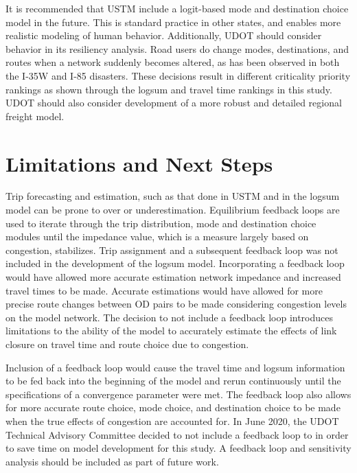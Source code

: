 It is recommended that USTM include a logit-based mode and destination
choice model in the future. This is standard practice in other states, and enables
more realistic modeling of
human behavior. Additionally, UDOT should consider behavior in its resiliency
analysis. Road users do change modes, destinations, and routes when a network
suddenly becomes altered, as has been observed in both the I-35W and I-85 disasters.
These decisions result in different criticality
priority rankings as shown through the logsum and travel time rankings in this study.
UDOT should also consider development of a more robust and detailed regional freight model.

\section{Limitations and Next Steps}

Trip forecasting and estimation, such as that done in USTM and in the logsum model
can be prone to over or underestimation. Equilibrium feedback loops are used to
iterate through the trip distribution, mode and destination choice modules until the
impedance value, which is a measure largely based on congestion, stabilizes.
Trip assignment and a subsequent feedback loop was not included in the development
of the logsum model. Incorporating a
feedback loop would have allowed more accurate estimation network impedance and increased
travel times to be made. Accurate estimations would have allowed for more precise
route changes between OD pairs to be made considering congestion levels on the model
network. The decision to not include a feedback loop introduces limitations to the
ability of the model to accurately estimate the effects of link closure on
travel time and route choice due to congestion.

Inclusion of a feedback loop would cause the
travel time and logsum information to be fed back into the beginning of the
model and rerun continuously until the specifications of a convergence
parameter were met. The feedback loop
also allows for more accurate route choice, mode choice, and destination
choice to be made when the true effects of congestion are accounted for.
In June 2020, the UDOT Technical Advisory Committee decided to not include a
feedback loop to in order to save time
on model development for this study. A feedback loop and sensitivity analysis
should be included as part of future work.

